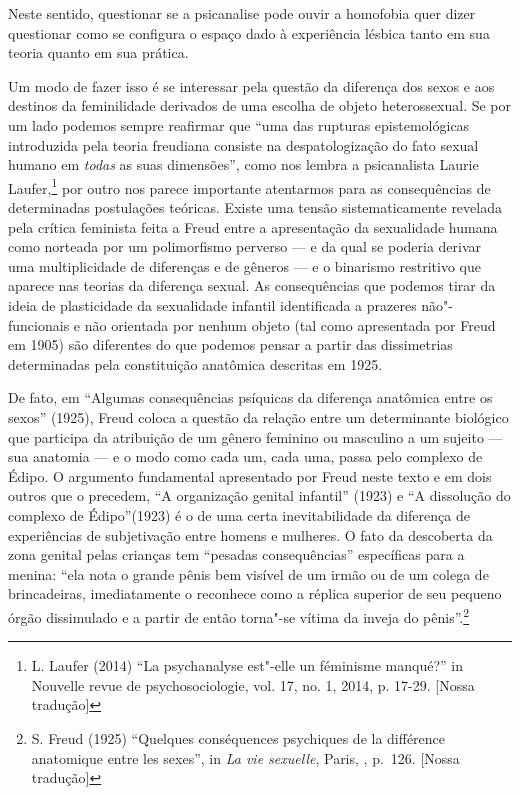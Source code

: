 Neste sentido, questionar se a psicanalise pode ouvir a homofobia quer
dizer questionar como se configura o espaço dado à experiência lésbica
tanto em sua teoria quanto em sua prática.

Um modo de fazer isso é se interessar pela questão da diferença dos
sexos e aos destinos da feminilidade derivados de uma escolha de objeto
heterossexual. Se por um lado podemos sempre reafirmar que ``uma das
rupturas epistemológicas introduzida pela teoria freudiana consiste na
despatologização do fato sexual humano em \emph{todas} as suas
dimensões'', como nos lembra a psicanalista Laurie Laufer,\footnote{L.
  Laufer (2014) ``La psychanalyse est"-elle un féminisme manqué?'' in
  Nouvelle revue de psychosociologie, vol. 17, no. 1, 2014, p. 17-29.
  {[}Nossa tradução{]}} por outro nos parece importante atentarmos para
as consequências de determinadas postulações teóricas. Existe uma tensão
sistematicamente revelada pela crítica feminista feita a Freud entre a
apresentação da sexualidade humana como norteada por um polimorfismo
perverso --- e da qual se poderia derivar uma multiplicidade de
diferenças e de gêneros --- e o binarismo restritivo que aparece nas
teorias da diferença sexual. As consequências que podemos tirar da ideia
de plasticidade da sexualidade infantil identificada a prazeres
não"-funcionais e não orientada por nenhum objeto (tal como apresentada
por Freud em 1905) são diferentes do que podemos pensar a partir das
dissimetrias determinadas pela constituição anatômica descritas em 1925.

De fato, em ``Algumas consequências psíquicas da diferença anatômica
entre os sexos'' (1925), Freud coloca a questão da relação entre um
determinante biológico que participa da atribuição de um gênero feminino
ou masculino a um sujeito --- sua anatomia --- e o modo como cada um, cada
uma, passa pelo complexo de Édipo. O argumento fundamental apresentado
por Freud neste texto e em dois outros que o precedem, ``A organização
genital infantil'' (1923) e ``A dissolução do complexo de Édipo''(1923)
é o de uma certa inevitabilidade da diferença de experiências de
subjetivação entre homens e mulheres. O fato da descoberta da zona
genital pelas crianças tem ``pesadas consequências'' específicas para a
menina: ``ela nota o grande pênis bem visível de um irmão ou de um
colega de brincadeiras, imediatamente o reconhece como a réplica
superior de seu pequeno órgão dissimulado e a partir de então torna"-se
vítima da inveja do pênis''.\footnote{S. Freud (1925) ``Quelques
  conséquences psychiques de la différence anatomique entre les sexes'',
  in \emph{La vie sexuelle}, Paris, , p.~126. {[}Nossa tradução{]}}


